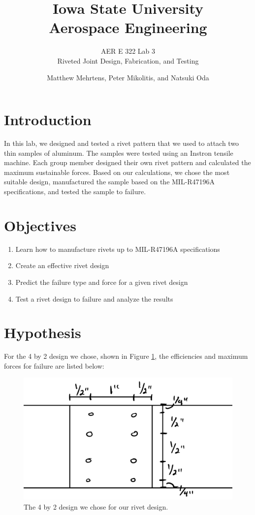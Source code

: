 \documentclass[12 pt]{article}
\title{\textbf{Iowa State University
\\{\Large Aerospace Engineering}}}
\subtitle{AER E 322 Lab 3\\
		  Riveted Joint Design, Fabrication, and Testing}
\author{Matthew Mehrtens, Peter Mikolitis, and Natsuki Oda}
\begin{document}
\maketitle
\tableofcontents
\section{Introduction} \label{introduction}
In this lab, we designed and tested a rivet pattern that we used to attach two thin samples of aluminum. The samples were tested using an Instron tensile machine. Each group member designed their own rivet pattern and calculated the maximum sustainable forces. Based on our calculations, we chose the most suitable design, manufactured the sample based on the MIL-R47196A specifications, and tested the sample to failure.

\section{Objectives} \label{objectives}
\begin{enumerate}
\item Learn how to manufacture rivets up to MIL-R47196A specifications
\item Create an effective rivet design
\item Predict the failure type and force for a given rivet design
\item Test a rivet design to failure and analyze the results
\end{enumerate}

\section{Hypothesis} \label{hypothesis}
For the \num{4} by \num{2} design we chose, shown in Figure \ref{fig:my-design}, the efficiencies and maximum forces for failure are listed below:

\begin{figure}[htbp]
\centering
\includegraphics[width=6in]{images/my-design}
\caption{The \num{4} by \num{2} design we chose for our rivet design.}
\label{fig:my-design}
\end{figure}
\end{document}
